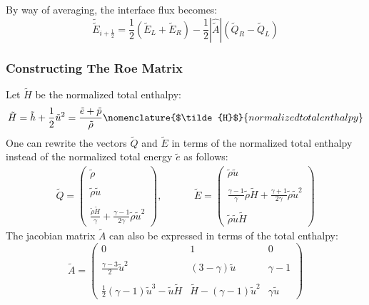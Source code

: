 \documentclass[11pt, a4paper]{article}
\begin{document}
By way of averaging, the interface flux becomes:
\begin{equation}
    \tilde{\tilde{E}}_{i+\frac{1}{2}}=\frac{1}{2}\left(\tilde{E}_L+\tilde{E}_R\right)-\frac{1}{2}\left|\hat{\tilde{A}}\right|\left(\tilde{Q}_R-\tilde{Q}_L\right)
\end{equation}

\subsubsection{Constructing The Roe Matrix}
Let $\tilde{H}$ be the normalized total enthalpy:
\begin{equation*}
    \tilde{H}=\tilde{h}+\frac{1}{2}\tilde{u}^2=\frac{\tilde{e}+\tilde{p}}{\tilde{\rho}}
    \nomenclature{$\tilde{H}$}{normalized total enthalpy}
\end{equation*}
One can rewrite the vectors $\tilde{Q}$ and $\tilde{E}$ in terms of the normalized total enthalpy instead of the normalized total energy $\tilde{e}$ as follows:
\begin{equation}
    \begin{matrix}
        \tilde{Q}=\begin{pmatrix}
            \tilde{\rho} \\\\
            \tilde{\rho}\tilde{u} \\\\
            \displaystyle\frac{\tilde{\rho}\tilde{H}}{\gamma}+\frac{\gamma-1}{2\gamma}\tilde{\rho}\tilde{u}^2
        \end{pmatrix},\hspace{1cm} & \tilde{E}=\begin{pmatrix}
            \tilde{\rho}\tilde{u} \\\\
            \displaystyle\frac{\gamma-1}{\gamma}\tilde{\rho}\tilde{H}+\frac{\gamma+1}{2\gamma}\tilde{\rho}\tilde{u}^2 \\\\
            \tilde{\rho}\tilde{u}\tilde{H}
        \end{pmatrix}
    \end{matrix}
\end{equation}
The jacobian matrix $\tilde{A}$ can also be expressed in terms of the total enthalpy:
\begin{equation}
    \tilde{A}=\begin{pmatrix}
        0 & 1 & 0 \\\\
        \displaystyle\frac{\gamma-3}{2}\tilde{u}^2 & \left(3-\gamma\right)\tilde{u} & \gamma-1 \\\\
        \displaystyle\frac{1}{2}\left(\gamma-1\right)\tilde{u}^3-\tilde{u}\tilde{H} & \tilde{H}-\left(\gamma-1\right)\tilde{u}^2 & \gamma\tilde{u}
    \end{pmatrix}
\end{equation}
\end{document}
